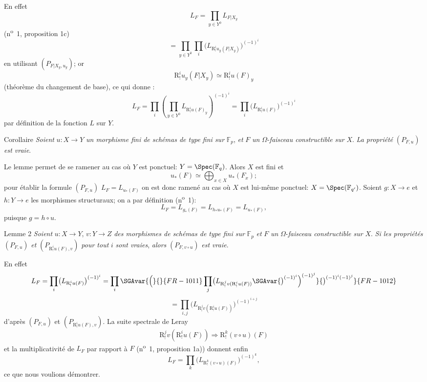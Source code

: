 En effet
\[
L_F=\prod_{y\in Y^0}L_{F|X_y}
\]
(n\textsuperscript{o}~1, proposition 1c)
\[
=\prod_{y\in Y^0}\prod_i\bigl(L_{\mathrm{R}^i_!u_y(F|X_y)}\bigr)^{(-1)^i}
\]
en utilisant $(P_{F|X_y,u_y})$; or
\[
\mathrm{R}^i_!u_y(F|X_y)\simeq \mathrm{R}^i_!u(F)_y
\]
(théorème du changement de base), ce qui 
donne :
\[
L_F=\prod_i\left(\prod_{y\in Y^0}L_{\mathrm{R}^i_!u(F)_y}\right)^{(-1)^i}
=\prod_i\bigl(L_{\mathrm{R}^i_!u(F)}\bigr)^{(-1)^i}
\]
par
définition de la fonction $L$ sur $Y$.

\begin{statement}{Corollaire}
\emph{Soient} $u:X\to Y$ \emph{un morphisme fini de schémas de type fini sur} $\mathbb{F}_p$, \emph{et} $F$ \emph{un} $\Omega$-\emph{faisceau constructible sur} $X$. \emph{La propriété} $(P_{F,u})$ \emph{est vraie}.
\end{statement}

Le lemme permet de se ramener au cas où $Y$ est ponctuel: $Y=\Spec(\mathbb{F}_q)$. Alors $X$ est fini et
\[
u_*(F)\simeq \bigoplus_{x\in X}u_*(F_x);
\]
pour établir la formule $(P_{F,u})$ $L_F=L_{u_*(F)}$ on est donc ramené au cas où $X$ est lui-même ponctuel: $X=\Spec(\mathbb{F}_{q'})$. Soient $g:X\to e$ et $h:Y\to e$ les morphismes structuraux; on a par définition (n\textsuperscript{o}~1):
\[
L_F=L_{g_*(F)}=L_{h_*u_*(F)}=L_{u_*(F)},
\]
puisque $g=h\circ u$.

\begin{statement}{Lemme 2}
\emph{Soient} $u:X\to Y$, $v:Y\to Z$ \emph{des morphismes de schémas de type fini sur} $\mathbb{F}_p$ \emph{et} $F$ \emph{un} $\Omega$-\emph{faisceau constructible sur} $X$. \emph{Si les propriétés} $(P_{F,u})$ \emph{et} $(P_{\mathrm{R}^i_!u(F),v})$ \emph{pour tout} $i$ \emph{sont vraies}, \emph{alors} $(P_{F,v\circ u})$ \emph{est vraie}.
\end{statement}

En effet
\[
L_F=\prod_i\bigl(L_{\mathrm{R}^i_!u(F)}\bigr)^{(-1)^i}
 =\prod_i\SGAvar{\Bigl(}{}{FR-1011}\prod_j\bigl(L_{\mathrm{R}^j_!v(\mathrm{R}^i_!u(F))}\SGAvar{\bigr)^{(-1)^i}\Bigr)^{(-1)^j}}{\bigr)^{(-1)^i(-1)^j}}{FR-1012}
\]
\[
=\prod_{i,j}\bigl(L_{\mathrm{R}^j_!v(\mathrm{R}^i_!u(F))}\bigr)^{(-1)^{i+j}}
\]
d'après $(P_{F,u})$ et $(P_{\mathrm{R}^i_!u(F),v})$. La suite spectrale de Leray
\[
\mathrm{R}^j_!v(\mathrm{R}^i_!u(F))\Longrightarrow \mathrm{R}^k_!(v\circ u)(F)
\]
et la multiplicativité de $L_F$ par
rapport à $F$ (n\textsuperscript{o}~1, proposition 1a)) donnent enfin
\[
L_F=\prod_k\bigl(L_{\mathrm{R}^k_!(v\circ u)(F)}\bigr)^{(-1)^k},
\]
ce que nous voulions démontrer.

